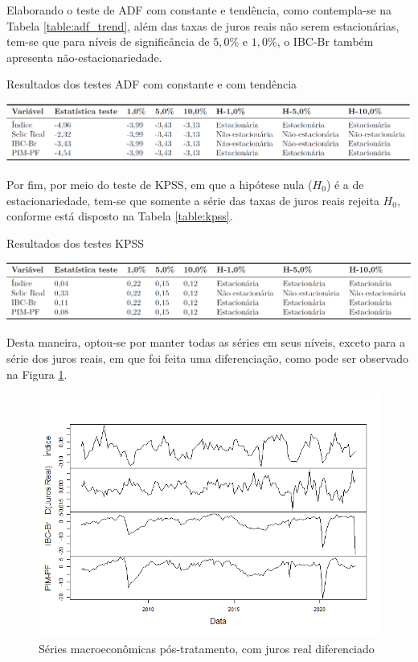 Elaborando o teste de ADF com constante e tendência, como contempla-se na Tabela \ref{table:adf_trend}, além das taxas de juros reais não serem estacionárias, tem-se que para níveis de significância de $5,0\%$ e $1,0\%$, o IBC-Br também apresenta não-estacionariedade.

\begin{table}[hbtp]
	\centering
	\caption{Resultados dos testes ADF com constante e com tendência} \label{table:adf_trend}
	\includegraphics[scale = 0.40]{figuras/teste_adf_trend.PNG}
\end{table}

Por fim, por meio do teste de KPSS, em que a hipótese nula ($H_{0}$) é a de estacionariedade, tem-se que somente a série das taxas de juros reais rejeita $H_{0}$, conforme está disposto na Tabela \ref{table:kpss}.

\begin{table}[hbtp]
	\centering
	\caption{Resultados dos testes KPSS} \label{table:kpss}
	\includegraphics[scale = 0.40]{figuras/teste_kpss.PNG}
\end{table}

\pagebreak{}

Desta maneira, optou-se por manter todas as séries em seus níveis, exceto para a série dos juros reais, em que foi feita uma diferenciação, como pode ser observado na Figura \ref{figure:series_macro_2}.

\begin{figure}[hbtp]
	\centering
	\caption{Séries macroeconômicas pós-tratamento, com juros real diferenciado} \label{figure:series_macro_2}
	\includegraphics[scale = 0.75]{figuras/graf_series_macro_2.png}
\end{figure}

